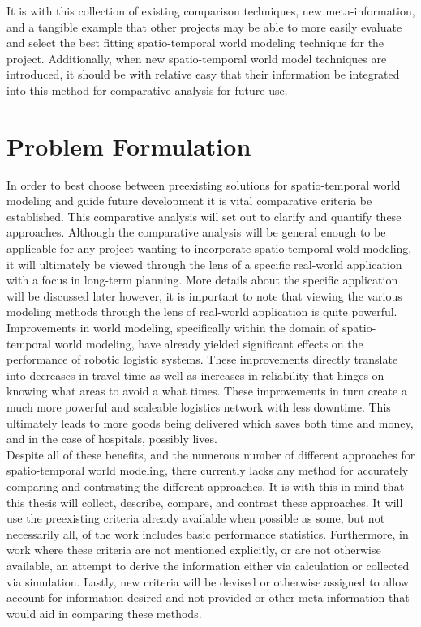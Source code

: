 It is with this collection of existing comparison techniques, new meta-information,
and a tangible example that other projects may be able to more easily evaluate
and select the best fitting spatio-temporal world modeling technique for the
project. Additionally, when new spatio-temporal world model techniques are
introduced, it should be with relative easy that their information be integrated
into this method for comparative analysis for future use.



\section{ Problem Formulation }

In order to best choose between preexisting solutions for spatio-temporal
world modeling and guide future development it is vital comparative criteria be
established. This comparative analysis will set out to clarify and quantify
these approaches. Although the comparative analysis will be general enough to be
applicable for any project wanting to incorporate spatio-temporal wold modeling,
it will ultimately be viewed through the lens of a specific real-world application
with a focus in long-term planning. More details about the specific application
will be discussed later however, it is important to note that viewing the
various modeling methods through the lens of real-world application is quite
powerful. \\

Improvements in world modeling, specifically within the domain of
spatio-temporal world modeling, have already yielded significant effects
on the performance of robotic logistic systems. These improvements directly
translate into decreases in travel time as well as increases in reliability
that hinges on knowing what areas to avoid a what times. These improvements in
turn create a much more powerful and scaleable logistics network with less
downtime. This  ultimately leads to more goods being delivered which saves
both time and money, and in the case of hospitals, possibly lives. \\

Despite all of these benefits, and the numerous number of different approaches
for spatio-temporal world modeling, there currently lacks any method for
accurately comparing and contrasting the different approaches. It is with this
in mind that this thesis will collect, describe, compare, and contrast these
approaches.  It will use the preexisting criteria already available when possible as some,
but not necessarily all, of the work includes basic performance statistics.
Furthermore, in work where these criteria are not mentioned explicitly, or are
not otherwise available, an attempt to derive the information either via
calculation or collected via simulation. Lastly, new criteria will be devised
or otherwise assigned to allow account for information desired and not provided
or other meta-information that would aid in comparing these methods. \\

